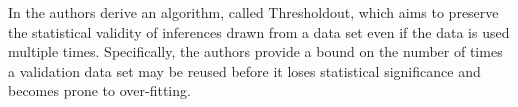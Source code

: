 \documentclass[float=false, crop=false]{standalone}
\begin{document}
	In \cite{Dwork2015} the authors derive an algorithm, called Thresholdout, which aims to preserve the statistical validity of inferences drawn from a data set even if the data is used multiple times. Specifically, the authors provide a bound on the number of times a validation data set may be reused before it loses statistical significance and becomes prone to over-fitting. 
	
	\ifstandalone
			
		
	\fi
\end{document}
